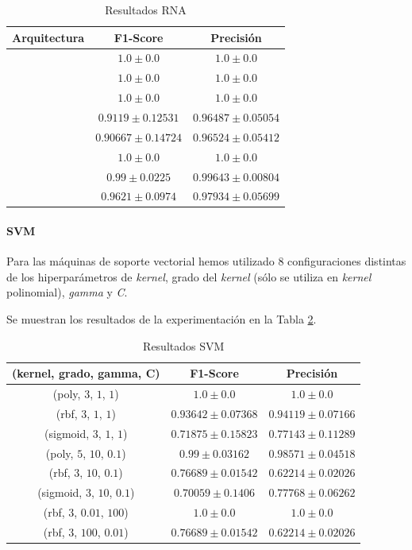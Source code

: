 \documentclass[12pt]{article}
\begin{document}
\begin{table}[ht]
	\caption{Resultados RNA}
	\centering
		 \begin{tabular}{||c c c||}
			 \hline
			 Arquitectura & F1-Score & Precisión  \\ [0.5ex]
			 \hline\hline
			 [2] & $1.0 \pm 0.0$ & $1.0 \pm 0.0$ \\
			 \hline
			 [4] & $1.0 \pm 0.0$ & $1.0 \pm 0.0$ \\
			 \hline
			 [8] & $1.0 \pm 0.0$ & $1.0 \pm 0.0$ \\
			 \hline
			 [2, 4] & $0.9119 \pm 0.12531$ & $0.96487 \pm 0.05054$ \\
			 \hline
			 [2, 8] & $0.90667 \pm 0.14724$ & $0.96524 \pm 0.05412$ \\
			 \hline
			 [4, 2] & $1.0 \pm 0.0$ & $1.0 \pm 0.0$ \\
			 \hline
			 [4, 4] & $0.99 \pm 0.0225$ & $0.99643 \pm 0.00804$ \\
			 \hline
			 [4, 8] & $0.9621 \pm 0.0974$ & $0.97934 \pm 0.05699$ \\
			 \hline
		 \end{tabular}
	\label{Tab:ANN_1}
\end{table}

\paragraph{SVM}

Para las máquinas de soporte vectorial hemos utilizado 8 configuraciones distintas de los hiperparámetros de \textit{kernel},
grado del \textit{kernel} (sólo se utiliza en \textit{kernel} polinomial), \textit{gamma} y \textit{C}.

Se muestran los resultados de la experimentación en la Tabla \ref{Tab:SVM_1}.

\begin{table}[!ht]
	\caption{Resultados SVM}
	\centering
		\begin{tabular}{||c c c||}
			\hline
			(kernel, grado, gamma, C) & F1-Score & Precisión  \\ [0.5ex]
			\hline\hline
			(poly, $3$, $1$, $1$) & $1.0 \pm 0.0$ & $1.0 \pm 0.0$ \\
			\hline
			(rbf, $3$, $1$, $1$) & $0.93642 \pm 0.07368$ & $0.94119 \pm 0.07166$ \\
			\hline
			(sigmoid, $3$, $1$, $1$) & $0.71875 \pm 0.15823$ & $0.77143 \pm 0.11289$ \\
			\hline
			(poly, $5$, $10$, $0.1$) & $0.99 \pm 0.03162$ & $0.98571 \pm 0.04518$ \\
			\hline
			(rbf, $3$, $10$, $0.1$) & $0.76689 \pm 0.01542$ & $0.62214 \pm 0.02026$ \\
			\hline
			(sigmoid, $3$, $10$, $0.1$) & $0.70059 \pm 0.1406$ & $0.77768 \pm 0.06262$ \\
			\hline
			(rbf, $3$, $0.01$, $100$) & $1.0 \pm 0.0$ & $1.0 \pm 0.0$ \\
			\hline
			(rbf, $3$, $100$, $0.01$) & $0.76689 \pm 0.01542$ & $0.62214 \pm 0.02026$ \\
			\hline
		\end{tabular}
	\label{Tab:SVM_1}
\end{table}
\end{document}
